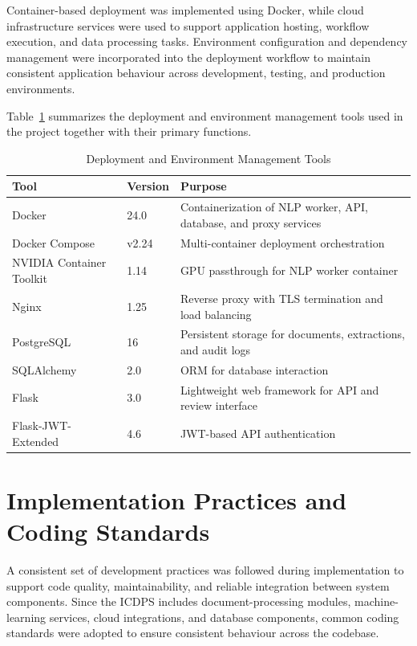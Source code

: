Container-based deployment was implemented using Docker, while cloud infrastructure services were used to support application hosting, workflow execution, and data processing tasks. Environment configuration and dependency management were incorporated into the deployment workflow to maintain consistent application behaviour across development, testing, and production environments.

Table~\ref{tab:deploy_tools} summarizes the deployment and environment management tools used in the project together with their primary functions.

\begin{table}[htbp]
\centering
\caption{Deployment and Environment Management Tools}
\label{tab:deploy_tools}
\begin{tabular}{|p{4.5cm}|p{1.5cm}|p{8cm}|}
\hline
\textbf{Tool} & \textbf{Version} & \textbf{Purpose} \\
\hline
Docker & 24.0 & Containerization of NLP worker, API, database, and proxy services \\
\hline
Docker Compose & v2.24 & Multi-container deployment orchestration \\
\hline
NVIDIA Container Toolkit & 1.14 & GPU passthrough for NLP worker container \\
\hline
Nginx & 1.25 & Reverse proxy with TLS termination and load balancing \\
\hline
PostgreSQL & 16 & Persistent storage for documents, extractions, and audit logs \\
\hline
SQLAlchemy & 2.0 & ORM for database interaction \\
\hline
Flask & 3.0 & Lightweight web framework for API and review interface \\
\hline
Flask-JWT-Extended & 4.6 & JWT-based API authentication \\
\hline
\end{tabular}
\end{table}

\section{Implementation Practices and Coding Standards}

A consistent set of development practices was followed during implementation to support code quality, maintainability, and reliable integration between system components. Since the ICDPS includes document-processing modules, machine-learning services, cloud integrations, and database components, common coding standards were adopted to ensure consistent behaviour across the codebase.

